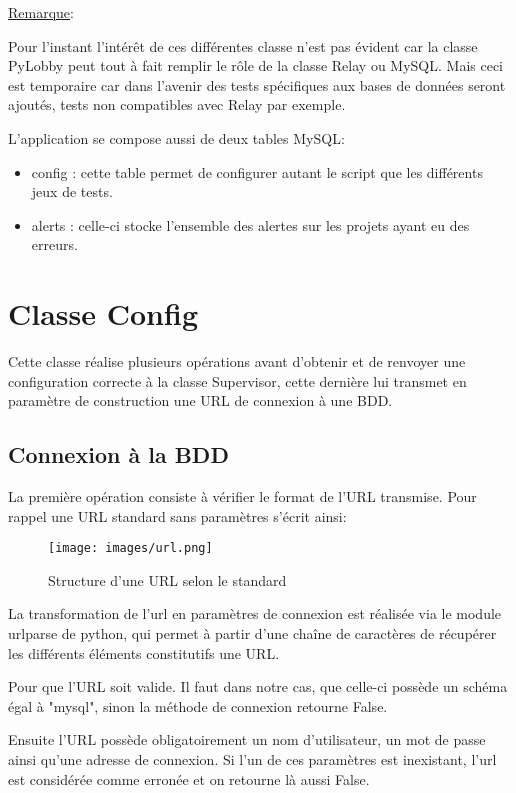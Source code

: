 \underline{Remarque}:

Pour l'instant l'intérêt de ces différentes classe n'est pas évident car la classe PyLobby peut tout à fait remplir le rôle de la classe Relay ou MySQL. Mais ceci est temporaire car dans l'avenir des tests spécifiques aux bases de données seront ajoutés, tests non compatibles avec Relay par exemple.

L'application se compose aussi de deux tables MySQL:

\begin{itemize}
	\item{config} : cette table permet de configurer autant le script que les différents jeux de tests.
	\item{alerts} : celle-ci stocke l'ensemble des alertes sur les projets ayant eu des erreurs.
\end{itemize}

\newpage

\section*{Classe Config}

Cette classe réalise plusieurs opérations avant d'obtenir et de renvoyer une configuration correcte à la classe Supervisor, cette dernière lui transmet en paramètre de construction une URL de connexion à une BDD.

\subsection*{Connexion à la BDD}

La première opération consiste à vérifier le format de l'URL transmise. Pour rappel une URL standard sans paramètres s'écrit ainsi:


\begin{figure}[h!]
	\centering
	\texttt{[image: images/url.png]}
	\caption{Structure d'une URL selon le standard}
\end{figure}


La transformation de l'url en paramètres de connexion est réalisée via le module urlparse de python, qui permet à partir d'une chaîne de caractères de récupérer les différents éléments constitutifs une URL.

Pour que l'URL soit valide. Il faut dans notre cas, que celle-ci possède un schéma égal à "mysql", sinon la méthode de connexion retourne False.

Ensuite l'URL possède obligatoirement un nom d'utilisateur, un mot de passe ainsi qu'une adresse de connexion. Si l'un de ces paramètres est inexistant,  l'url est considérée comme erronée et on retourne là aussi False.

